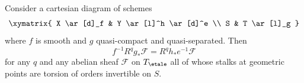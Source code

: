 %

\begin{theorem}
\label{theorem-smooth-base-change}
Consider a cartesian diagram of schemes
$$
\xymatrix{
X \ar[d]_f & Y \ar[l]^h \ar[d]^e \\
S & T \ar[l]_g
}
$$
where $f$ is smooth and $g$ quasi-compact and quasi-separated. Then
$$
f^{-1}R^qg_*\mathcal{F} = R^qh_*e^{-1}\mathcal{F}
$$
for any $q$ and any abelian sheaf $\mathcal{F}$
on $T_\etale$ all of whose stalks at geometric points are torsion of
orders invertible on $S$.
\end{theorem}

